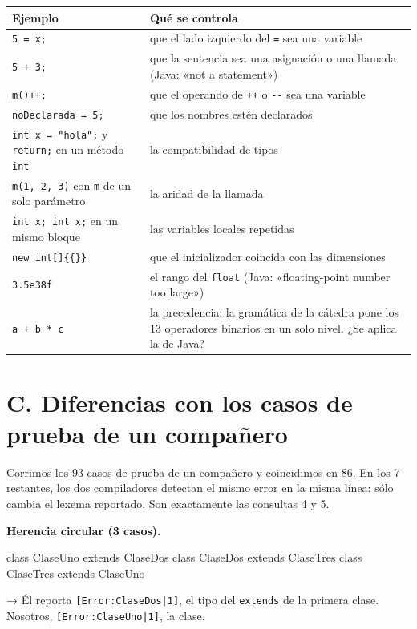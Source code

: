 \documentclass[12pt,a4paper]{article}
\newcommand{\cod}[1]{\texttt{#1}}
\newcommand{\pregunta}[1]{\par\medskip\needspace{4\baselineskip}\noindent\textbf{#1}\par\smallskip}
\begin{document}
\smallskip
\begin{tabular}{>{\raggedright\arraybackslash}p{5.6cm} >{\raggedright\arraybackslash}p{9.4cm}}
\toprule
\textbf{Ejemplo} & \textbf{Qué se controla} \\
\midrule
\cod{5 = x;} & que el lado izquierdo del \cod{=} sea una variable \\
\cod{5 + 3;} & que la sentencia sea una asignación o una llamada (Java: «not a statement») \\
\cod{m()++;} & que el operando de \cod{++} o \cod{-{}-} sea una variable \\
\cod{noDeclarada = 5;} & que los nombres estén declarados \\
\cod{int x = "hola";} y \cod{return;} en un método \cod{int} & la compatibilidad de tipos \\
\cod{m(1, 2, 3)} con \cod{m} de un solo parámetro & la aridad de la llamada \\
\cod{int x; int x;} en un mismo bloque & las variables locales repetidas \\
\cod{new int[]\{\{\}\}} & que el inicializador coincida con las dimensiones \\
\cod{3.5e38f} & el rango del \cod{float} (Java: «floating-point number too large») \\
\cod{a + b * c} & la precedencia: la gramática de la cátedra pone los 13 operadores binarios en
un solo nivel. ¿Se aplica la de Java? \\
\bottomrule
\end{tabular}

\section*{C. Diferencias con los casos de prueba de un compañero}

Corrimos los 93 casos de prueba de un compañero y coincidimos en 86. En los 7 restantes, los dos
compiladores detectan el mismo error en la misma línea: sólo cambia el lexema reportado. Son
exactamente las consultas 4 y 5.

\pregunta{Herencia circular (3 casos).}

\begin{fuente}
class ClaseUno extends ClaseDos { }
class ClaseDos extends ClaseTres { }
class ClaseTres extends ClaseUno { }
\end{fuente}

→ Él reporta \cod{[Error:ClaseDos|1]}, el tipo del \cod{extends} de la primera clase. Nosotros,
\cod{[Error:ClaseUno|1]}, la clase.
\end{document}
